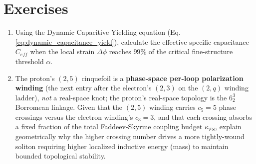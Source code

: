 \section*{Exercises}
\begin{enumerate}
    \item Using the Dynamic Capacitive Yielding equation (Eq. \ref{eq:dynamic_capacitance_yield}), calculate the effective specific capacitance $C_{eff}$ when the local strain $\Delta\phi$ reaches $99\%$ of the critical fine-structure threshold $\alpha$.
    \item The proton's $(2,5)$ cinquefoil is a \textbf{phase-space per-loop polarization winding} (the next entry after the electron's $(2,3)$ on the $(2,q)$ winding ladder), \emph{not} a real-space knot; the proton's real-space topology is the $6^3_2$ Borromean linkage. Given that the $(2,5)$ winding carries $c_5 = 5$ phase crossings versus the electron winding's $c_3 = 3$, and that each crossing absorbs a fixed fraction of the total Faddeev-Skyrme coupling budget $\kappa_{FS}$, explain geometrically why the higher crossing number drives a more tightly-wound soliton requiring higher localized inductive energy (mass) to maintain bounded topological stability.
\end{enumerate}
